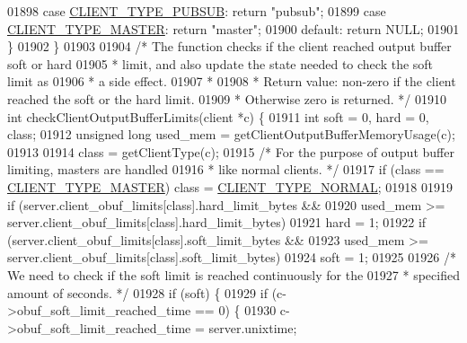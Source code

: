 \begin{DoxyCode}
{{{{{{{{{{{{{{{{{{{{01898     \textcolor{keywordflow}{case} \hyperlink{server_8h_a2376a35dc691e54127260d5cd818f7dd}{CLIENT\_TYPE\_PUBSUB}: \textcolor{keywordflow}{return} \textcolor{stringliteral}{"pubsub"};
01899     \textcolor{keywordflow}{case} \hyperlink{server_8h_ae96c04932d9a47108994d8f337fd8563}{CLIENT\_TYPE\_MASTER}: \textcolor{keywordflow}{return} \textcolor{stringliteral}{"master"};
01900     \textcolor{keywordflow}{default}:                       \textcolor{keywordflow}{return} NULL;
01901     \}
01902 \}
01903 
01904 \textcolor{comment}{/* The function checks if the client reached output buffer soft or hard}
01905 \textcolor{comment}{ * limit, and also update the state needed to check the soft limit as}
01906 \textcolor{comment}{ * a side effect.}
01907 \textcolor{comment}{ *}
01908 \textcolor{comment}{ * Return value: non-zero if the client reached the soft or the hard limit.}
01909 \textcolor{comment}{ *               Otherwise zero is returned. */}
01910 \textcolor{keywordtype}{int} checkClientOutputBufferLimits(client *c) \{
01911     \textcolor{keywordtype}{int} soft = 0, hard = 0, \textcolor{keyword}{class};
01912     \textcolor{keywordtype}{unsigned} \textcolor{keywordtype}{long} used\_mem = getClientOutputBufferMemoryUsage(c);
01913 
01914     \textcolor{keyword}{class} = getClientType(c);
01915     \textcolor{comment}{/* For the purpose of output buffer limiting, masters are handled}
01916 \textcolor{comment}{     * like normal clients. */}
01917     \textcolor{keywordflow}{if} (\textcolor{keyword}{class} == \hyperlink{server_8h_ae96c04932d9a47108994d8f337fd8563}{CLIENT\_TYPE\_MASTER}) \textcolor{keyword}{class} = 
      \hyperlink{server_8h_abd88c3450a5175a5c4a766741f361d5b}{CLIENT\_TYPE\_NORMAL};
01918 
01919     \textcolor{keywordflow}{if} (server.client\_obuf\_limits[\textcolor{keyword}{class}].hard\_limit\_bytes &&
01920         used\_mem >= server.client\_obuf\_limits[\textcolor{keyword}{class}].hard\_limit\_bytes)
01921         hard = 1;
01922     \textcolor{keywordflow}{if} (server.client\_obuf\_limits[\textcolor{keyword}{class}].soft\_limit\_bytes &&
01923         used\_mem >= server.client\_obuf\_limits[\textcolor{keyword}{class}].soft\_limit\_bytes)
01924         soft = 1;
01925 
01926     \textcolor{comment}{/* We need to check if the soft limit is reached continuously for the}
01927 \textcolor{comment}{     * specified amount of seconds. */}
01928     \textcolor{keywordflow}{if} (soft) \{
01929         \textcolor{keywordflow}{if} (c->obuf\_soft\_limit\_reached\_time == 0) \{
01930             c->obuf\_soft\_limit\_reached\_time = server.unixtime;
}}}}}}}}}}}}}}}}}}}}
\end{DoxyCode}
